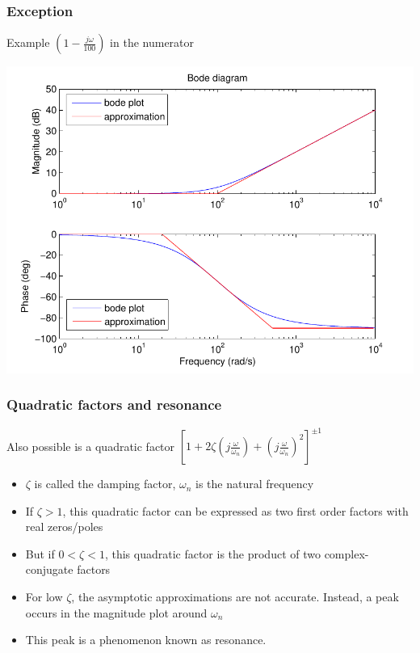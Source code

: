 \begin{frame}
\frametitle{Exception}
Example $(1 - \frac{j\omega}{100})$ in the numerator

\begin{center}
\includegraphics[scale=0.5]{BodeException}
\end{center}

\end{frame}


\begin{frame}
\frametitle{Quadratic factors and resonance}

Also possible is a quadratic factor $[1 + 2\zeta(j\frac{\omega}{\omega_n}) +  (j\frac{\omega}{\omega_n})^2]^{\pm1}$
\begin{itemize}
\item $\zeta$ is called the damping factor, $\omega_n$ is the natural frequency
\item If $\zeta > 1$, this quadratic factor can be expressed as two first order factors with real zeros/poles
\item But if $0 < \zeta < 1 $, this quadratic factor is the product of two complex-conjugate factors
\item For low $\zeta$, the asymptotic approximations are not accurate. Instead, a peak occurs in the magnitude plot around $\omega_n$
\item This peak is a phenomenon known as resonance. 
\end{itemize}

\end{frame}




